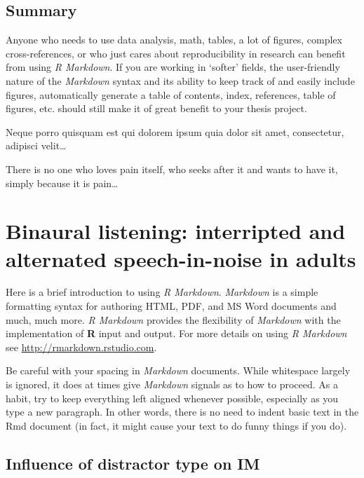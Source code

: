 \documentclass[a4paper, twoside]{templates/ociamthesis}
\begin{document}
\hypertarget{summary}{%
\section*{Summary}\label{summary}}

Anyone who needs to use data analysis, math, tables, a lot of figures, complex cross-references, or who just cares about reproducibility in research can benefit from using \emph{R Markdown}.
If you are working in `softer' fields, the user-friendly nature of the \emph{Markdown} syntax and its ability to keep track of and easily include figures, automatically generate a table of contents, index, references, table of figures, etc. should still make it of great benefit to your thesis project.

\begin{savequote}
Neque porro quisquam est qui dolorem ipsum quia dolor sit amet,
consectetur, adipisci velit\ldots{}

There is no one who loves pain itself, who seeks after it and wants to
have it, simply because it is pain\ldots{}
\end{savequote}



\hypertarget{rmd-basics}{%
\chapter{Binaural listening: interripted and alternated speech-in-noise in adults}\label{rmd-basics}}

\minitoc 

Here is a brief introduction to using \emph{R Markdown}.
\emph{Markdown} is a simple formatting syntax for authoring HTML, PDF, and MS Word documents and much, much more.
\emph{R Markdown} provides the flexibility of \emph{Markdown} with the implementation of \textbf{R} input and output. For more details on using \emph{R Markdown} see \url{http://rmarkdown.rstudio.com}.

Be careful with your spacing in \emph{Markdown} documents.
While whitespace largely is ignored, it does at times give \emph{Markdown} signals as to how to proceed.
As a habit, try to keep everything left aligned whenever possible, especially as you type a new paragraph.
In other words, there is no need to indent basic text in the Rmd document (in fact, it might cause your text to do funny things if you do).

\hypertarget{influence-of-distractor-type-on-im}{%
\section{Influence of distractor type on IM}\label{influence-of-distractor-type-on-im}}
\end{document}

